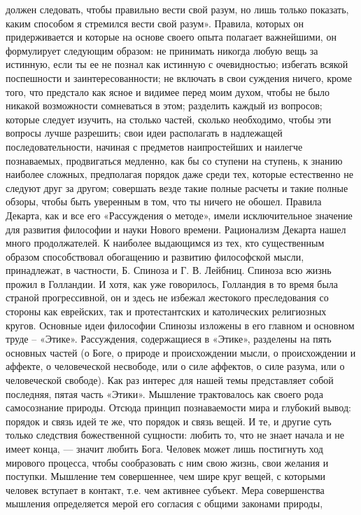 \documentclass[12pt]{article}
\begin{document}
должен следовать, чтобы правильно вести свой разум, но лишь только показать, каким способом я стремился
вести свой разум».
Правила, которых он придерживается и которые на основе своего опыта полагает важнейшими, он формулирует
следующим образом:
не принимать никогда любую вещь за истинную, если ты ее не познал как истинную с очевидностью;
избегать всякой поспешности и заинтересованности; не включать в свои суждения ничего, кроме того, что
предстало как ясное и видимее перед моим духом, чтобы не было никакой возможности сомневаться в этом;
разделить каждый из вопросов; которые следует изучить, на столько частей, сколько необходимо, чтобы эти 
вопросы лучше разрешить;
свои идеи располагать в надлежащей последовательности, начиная с предметов наипростейших и
наилегче познаваемых, продвигаться медленно, как бы со ступени на ступень, к знанию наиболее
сложных, предполагая порядок даже среди тех, которые естественно не следуют друг за другом;
совершать везде такие полные расчеты и такие полные обзоры, чтобы быть уверенным в том, что ты ничего не
обошел.
Правила Декарта, как и все его «Рассуждения о методе», имели исключительное значение для развития
философии и науки Нового времени.
Рационализм Декарта нашел много продолжателей. К наиболее выдающимся из тех, кто существенным образом
способствовал обогащению и развитию философской мысли, принадлежат, в частности, Б. Спиноза и Г. В.
Лейбниц.
Спиноза всю жизнь прожил в Голландии. И хотя, как уже говорилось, Голландия в то время была страной
прогрессивной, он и здесь не избежал жестокого преследования со стороны как еврейских, так и
протестантских и католических религиозных кругов.
Основные идеи философии Спинозы изложены в его главном и основном труде – «Этике». Рассуждения,
содержащиеся в «Этике», разделены на пять основных частей (о Боге, о природе и происхождении мысли, о
происхождении и аффекте, о человеческой несвободе, или о силе аффектов, о силе разума, или о
человеческой свободе). Как раз интерес для нашей темы представляет собой последняя, пятая часть «Этики».
Мышление трактовалось как своего рода самосознание природы. Отсюда принцип познаваемости мира и
глубокий вывод: порядок и связь идей те же, что порядок и связь вещей. И те, и другие суть только следствия
божественной сущности: любить то, что не знает начала и не имеет конца, — значит любить Бога. Человек
может лишь постигнуть ход мирового процесса, чтобы сообразовать с ним свою жизнь, свои желания и
поступки. Мышление тем совершеннее, чем шире круг вещей, с которыми человек вступает в контакт, т.е. чем
активнее субъект. Мера совершенства мышления определяется мерой его согласия с общими законами природы,
\end{document}
